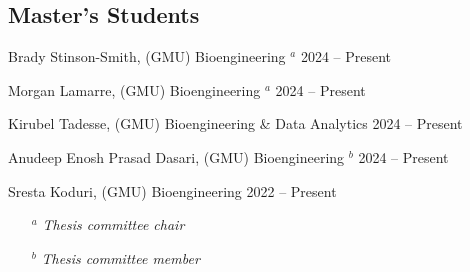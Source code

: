 \documentclass[letterpaper, 10pt]{article}
\begin{document}
\subsection{\textbf{Master's Students}}
\begin{compacthang}
     \item Brady Stinson-Smith, (GMU) Bioengineering $^{a}$ \hfill 2024 -- Present
     \item Morgan Lamarre, (GMU) Bioengineering $^{a}$ \hfill 2024 -- Present
	\item Kirubel Tadesse, (GMU) Bioengineering \& Data Analytics \hfill 2024 -- Present
     \item Anudeep Enosh Prasad Dasari, (GMU) Bioengineering $^{b}$ \hfill 2024 -- Present
	\item Sresta Koduri, (GMU) Bioengineering \hfill 2022 -- Present
     \begin{itemize}
	     \item[$^{a}$] \textit{Thesis committee chair}
	     \item[$^{b}$] \textit{Thesis committee member}
     \end{itemize}	
\end{compacthang}

\end{document}
